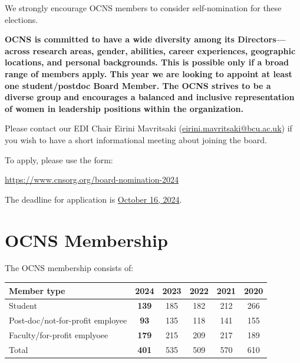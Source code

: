 \documentclass[11pt,a4paper,oneside]{article}
\begin{document}
We strongly encourage OCNS members to consider self-nomination for these elections.

\begin{tcolorbox}[colback=CornflowerBlue, colframe=black, width=\textwidth, boxrule=0.1mm]
\textbf{OCNS is committed to have a wide diversity among its Directors---across research areas, gender, abilities, career experiences, geographic locations, and personal backgrounds.
This is possible only if a broad range of members apply.
This year we are looking to appoint at least one student/postdoc Board Member.
The OCNS strives to be a diverse group and encourages a balanced and inclusive representation of women in leadership positions within the organization.}
\end{tcolorbox}

Please contact our EDI Chair Eirini Mavritsaki (\href{mailto:eirini.mavritsaki@bcu.ac.uk}{eirini.mavritsaki@bcu.ac.uk}) if you wish to have a short informational meeting about joining the board.

To apply, please use the form:

\begin{center}
\url{https://www.cnsorg.org/board-nomination-2024}
\end{center}

The deadline for application is \underline{October 16, 2024}.

\clearpage
\section*{OCNS Membership}%
\sectionauthor{\vspace{-4ex}}

The OCNS membership consists of:
\begin{table}[!h]
  \centering
  \begin{tabularx}{0.7\textwidth}{X|ccccc}
    \textbf{Member type}& \textbf{2024} & \textbf{2023} & \textbf{2022} & \textbf{2021} & \textbf{2020} \\
    \toprule{}
    Student & \textbf{139} &  185 & 182 & 212 & 266 \\
    Post-doc/not-for-profit employee & \textbf{93} & 135 & 118 & 141 & 155 \\
    Faculty/for-profit emplyoee & \textbf{179} & 215 & 209 & 217 & 189 \\
    \midrule{}
    Total & \textbf{401} & 535 & 509 & 570 & 610 \\
  \end{tabularx}
\end{table}
\end{document}

